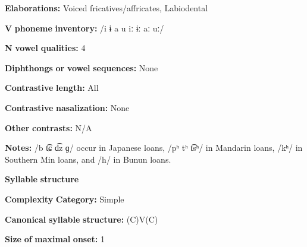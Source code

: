 \documentclass[output=paper]{langsci/langscibook}
\begin{document}
\begin{styleBody}
\textbf{Elaborations:} Voiced fricatives/affricates, Labiodental
\end{styleBody}

\begin{styleBody}
\textbf{V} \textbf{phoneme} \textbf{inventory:} /i ɨ a u iː ɨː aː uː/
\end{styleBody}

\begin{styleBody}
\textbf{N} \textbf{vowel} \textbf{qualities:} 4
\end{styleBody}

\begin{styleBody}
\textbf{Diphthongs} \textbf{or} \textbf{vowel} \textbf{sequences:} None
\end{styleBody}

\begin{styleBody}
\textbf{Contrastive} \textbf{length:} All
\end{styleBody}

\begin{styleBody}
\textbf{Contrastive} \textbf{nasalization:} None
\end{styleBody}

\begin{styleBody}
\textbf{Other} \textbf{contrasts:} N/A
\end{styleBody}

\begin{styleBody}
\textbf{Notes:} /b t͡ɕ d͡z ɡ/ occur in Japanese loans, /pʰ tʰ t͡sʰ/ in Mandarin loans, /kʰ/ in Southern Min loans, and /h/ in Bunun loans.
\end{styleBody}

\begin{styleBody}
\textbf{Syllable} \textbf{structure}
\end{styleBody}

\begin{styleBody}
\textbf{Complexity} \textbf{Category:} Simple
\end{styleBody}

\begin{styleBody}
\textbf{Canonical} \textbf{syllable} \textbf{structure:} (C)V(C) \citep[32-33]{Pan2012}
\end{styleBody}

\begin{styleBody}
\textbf{Size} \textbf{of} \textbf{maximal} \textbf{onset:} 1
\end{styleBody}
\end{document}
